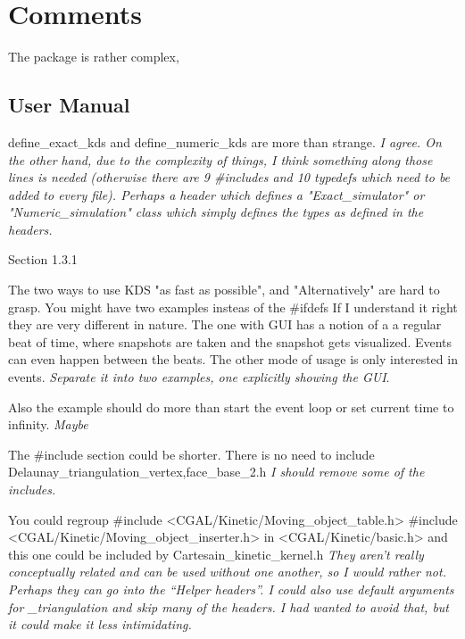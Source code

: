 \section{Comments}


The package is rather complex,


\subsection{User Manual}


define_exact_kds and define_numeric_kds are more than strange.
\textit{I agree. On the other hand, due to the complexity of things, I
think something along those lines is needed (otherwise there are 9
#includes and 10 typedefs which need to be added to every
file). Perhaps a header which defines a "Exact_simulator" or
"Numeric_simulation" class which simply defines the types as defined
in the headers.}






Section 1.3.1

The two ways to use KDS  "as fast as possible", and "Alternatively"
are hard to grasp. You might have two examples  insteas of the #ifdefs
If I understand it right they are very different in nature. The one
with GUI has a notion of a a regular beat of time, where snapshots
are taken and the snapshot gets visualized. Events can even happen
between the beats. The other mode of usage is only interested in
events.
\textit{Separate it into two examples, one explicitly showing the GUI}.


Also the example should do more than start the event loop  or
set current time to infinity.
\textit{Maybe}





The #include section could be shorter.
There is no need to include Delaunay_triangulation_{vertex,face}_base_2.h
\textit{I should remove some of the includes.}

You could regroup
#include <CGAL/Kinetic/Moving_object_table.h>
#include <CGAL/Kinetic/Moving_object_inserter.h>
in <CGAL/Kinetic/basic.h> and this one could
be included by Cartesain_kinetic_kernel.h
\textit{They aren't really conceptually related and can be used without one another, so I would rather not. Perhaps they can go into the ``Helper headers''. I could also use default arguments for _triangulation and skip many of the headers. I had wanted to avoid that, but it could make it less intimidating.}


